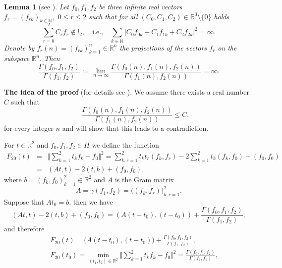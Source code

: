 \documentclass[preprint,12pt]{elsarticle}
\newtheorem{lem}[thm]{Lemma}
\numberwithin{equation}{section}
\begin{document}
\begin{lem}
[see \cite{Kos-m-Arx23}]
\label{l.min=proj.3}
Let $f_0,f_1,f_2$ be three infinite real vectors\\ $f_r=(f_{rk})_{k\in \mathbb N},$
$0\leq r\leq 2$
such that for all $(C_0,C_1,C_2)\in {\mathbb R}^{3}\setminus\{0\}$  holds
\begin{equation}
\label{norm=infty.3}
\sum_{r=0}^2C_rf_r\not\in l_2,\quad\text{i.e.,} \quad
\sum_{k\in \mathbb N}\vert C_0f_{0k}+C_1f_{1k}+C_2f_{2k}\vert^2=\infty.
\end{equation}
Denote by $f_r(n)=(f_{rk})_{k=1}^n\in \mathbb R^n$ the projections of the vectors $f_r$ on the subspace $\mathbb R^n$. Then
\begin{equation}
\label{final.3}
\frac{\Gamma(f_0,f_1,f_2)}{\Gamma(f_1,f_2)}:=
\lim_{n\to\infty}\frac{\Gamma(f_0(n),f_1(n),f_2(n))}{\Gamma(f_1(n),f_2(n))}
=\infty.
\end{equation}
\end{lem}


{\bf The idea of the proof} (for details see \cite{Kos-m-Arx23}).
We assume there exists a real number $C$ such that 
%
\begin{equation}
\label{<C.m=2}
\quad\quad\frac{\Gamma(f_0(n),f_1(n),f_2(n))}{\Gamma(f_1(n),f_2(n))}\leq C,
\end{equation}
for every integer $n$ and will show that this leads to a contradiction.


For $t\in \mathbb R^2$ and $f_0,f_1,f_2\in H$ we define the function
\begin{eqnarray*}
F_{20}(t)&=&\Vert\sum_{k=1}^2t_kf_k-f_0\Vert ^2=
\sum_{k,r=1}^2t_kt_r(f_k,f_r)-2\sum_{k=1}^2t_k(f_k,f_0)+(f_0,f_0)\\
\nonumber
&=&(At,t)-2(t,b)+(f_0,f_0),
\end{eqnarray*}
where $b=(f_k,f_0)_{k=1}^2\in \mathbb R^2$ and $A$ is the Gram matrix 
$$A=\gamma(f_1,f_2)=\big((f_k,f_r)\big)_{k,r=1}^2.
$$
Suppose that $At_0=b$, then we have
\begin{equation*}
(At,t)-2(t,b)+(f_0,f_0)
=(A(t-t_0),(t-t_0))+
\frac{\Gamma(f_0,f_1,f_2)}{\Gamma(f_1,f_2)},
\end{equation*}  
and therefore
\begin{eqnarray}
\nonumber
&& 
 F_{20}(t)=
 \big(A(t-t_0),(t-t_0)\big)+
\frac{\Gamma(f_0,f_1,f_2)}{\Gamma(f_1,f_2)},\\
 \label{F_3(t)=(At,t).1}
&& 
 F_{20}(t_0)=\min_{(t_1,t_2)\in \mathbb R^2}\Vert\sum_{k=1}^2t_kf_k-f_0\Vert ^2=
\frac{\Gamma(f_0,f_1,f_2)}{\Gamma(f_1,f_2)},
\end{eqnarray}
\end{document}

